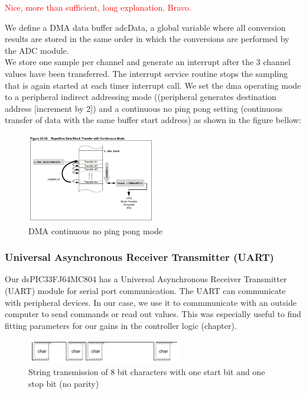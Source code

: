 \textcolor{red}{Nice, more than sufficient, long explanation. Bravo.}

We define a DMA data buffer adcData, a global variable where all conversion results are stored in the same order in which the conversions are performed by the ADC module.\\
We store one sample per channel and generate an interrupt after the 3 channel values have been transferred. The interrupt service routine stops the sampling that is again started at each timer interrupt call.
\vskip 0.1in
\noindent
We set the dma operating mode to a peripheral indirect addressing mode ((peripheral generates destination address [increment by 2]) and a continuous no ping pong setting (continuous transfer of data with the same buffer start address) as shown in the figure bellow:

\begin{figure}[H]
    \centering
    \includegraphics[width=0.5\textwidth]{figures/software/DMA.png}
    \caption{DMA continuous no ping pong mode}
    \label{fig:dma}
\end{figure}

\subsubsection*{Universal Asynchronous Receiver Transmitter (UART)}
Our dsPIC33FJ64MC804 has a Universal Asynchronous Receiver Transmitter (UART)  module for serial port communication.
The UART can communicate with peripheral devices.
In our case, we use it to commmunicate with an outside computer to send commands or read out values. This was especially useful to find fitting parameters for our gains in the controller logic (chapter).

\begin{figure}[htb]
    \centering
    \includegraphics[width=0.6\textwidth]{figures/software/uart_demo.png}
    \caption {String transmission of 8 bit characters with one start bit and one stop bit (no parity) \cite{alex}}
    \label{fig:uart_demo}
\end{figure}

